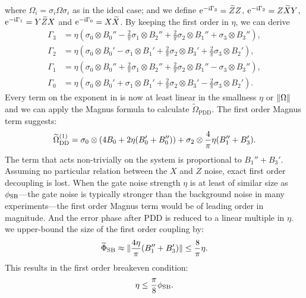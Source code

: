 \documentclass[b5paper,11pt]{article}
\newcommand{\wt}[1]{\widetilde{#1}}
\newcommand{\rDD}{\mathrm{DD}}
\begin{document}
where $\Omega_i = \sigma_i \Omega \sigma_i$ as in the ideal case; and we define
$\upe^{-\upi  \Gamma_3}=\wt Z Z$, 
$\upe^{-\upi  \Gamma_2}=Z \wt X Y$,
$\upe^{-\upi  \Gamma_1}=Y \wt Z X$ and 
$\upe^{-\upi  \Gamma_0}=X \wt X$.
By keeping the first order in 
$\eta$, we can derive
\begin{equation}
 \begin{aligned}
  \Gamma_3 &= \eta(\sigma_0 \otimes B_0''- \frac{2}{\pi} \sigma_1 \otimes B_2'' 
  +\frac{2}{\pi}  \sigma_2 \otimes B_1'' + \sigma_3 \otimes B_3''),\\
  \Gamma_2 &= \eta(\sigma_0 \otimes B_0'- \sigma_1 \otimes B_1'
  +\frac{2}{\pi}  \sigma_2 \otimes B_3' + \frac{2}{\pi} \sigma_3 \otimes B_2'),\\
  \Gamma_1 &= \eta(\sigma_0 \otimes B_0''+ \frac{2}{\pi} \sigma_1 \otimes B_2'' 
  +\frac{2}{\pi}  \sigma_2 \otimes B_1'' - \sigma_3 \otimes B_3''),\\
  \Gamma_0 &= \eta(\sigma_0 \otimes B_0'+ \sigma_1 \otimes B_1'
  +\frac{2}{\pi}  \sigma_2 \otimes B_3' - \frac{2}{\pi} \sigma_3 \otimes B_2').
 \end{aligned}
\end{equation}
Every term on the exponent in   is now at least linear in the smallness $\eta$ or $\Vert {\Omega} \Vert$ and we can apply the Magnus formula to calculate $\widetilde\Omega_\mathrm{PDD}$. 
The first order Magnus term suggests:
\begin{equation}
 \wt\Omega_\rDD\up{1}= \sigma_0 \otimes (4B_0 + 2\eta( B'_0 + B''_0)) 
+ \sigma_2 \otimes \frac{4}{\pi}\eta(B_1''+B_3').
\end{equation}
The term that acts non-trivially on the system is proportional to $B_1''+B_3'$. 
Assuming no particular relation between the $X$ and $Z$ noise,  exact first order decoupling is lost. 
When the gate noise strength $\eta$ is at least of similar size as $\phi_{\mathrm{SB}}$---the gate noise is typically stronger than the background noise in many experiments---the first order Magnus term would be of leading order in magnitude. And the error phase after PDD is reduced to a linear multiple in $\eta$. 
 we upper-bound the size of the first order coupling by:
\begin{equation}
 \wt\Phi_\rSB \approx \norm{ \frac{4\eta}{\pi}(B_1''+B_3')} \le \frac{8}{\pi}\eta.
\end{equation}
This results in the first order breakeven condition:
\begin{equation}
 \eta \le \frac{\pi}{8} \phi_{\mathrm{SB}}.
\end{equation}
\end{document}
